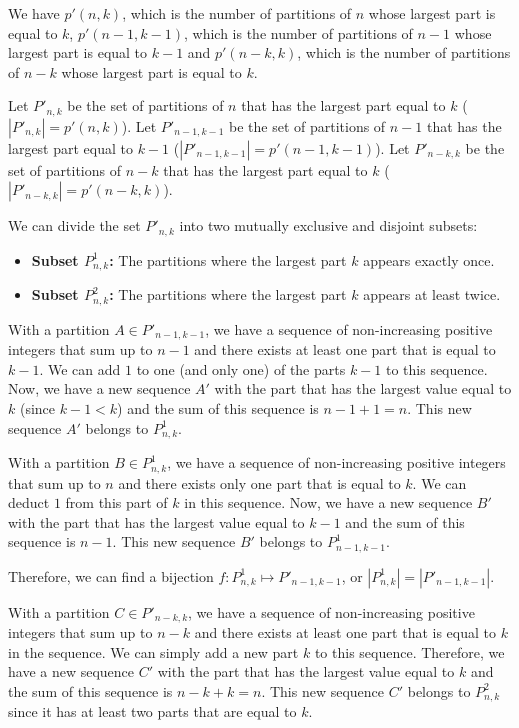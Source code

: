 \documentclass[10pt]{article}
\begin{document}
\begin{enumerate}
\begin{enumerate}
We have $p'(n,k)$, which is the number of partitions of $n$ whose largest part is equal to $k$, $p'(n-1,k-1)$, which is the number of partitions of $n-1$ whose largest part is equal to $k-1$ and $p'(n-k,k)$, which is the number of partitions of $n-k$ whose largest part is equal to $k$.

Let $P'_{n,k}$ be the set of partitions of $n$ that has the largest part equal to $k$ ($|P'_{n,k}|=p'(n,k)$). Let $P'_{n-1,k-1}$ be the set of partitions of $n-1$ that has the largest part equal to $k-1$ ($|P'_{n-1,k-1}|=p'(n-1,k-1)$). Let $P'_{n-k,k}$ be the set of partitions of $n-k$ that has the largest part equal to $k$ ($|P'_{n-k,k}|=p'(n-k,k)$).

We can divide the set $P'_{n,k}$ into two mutually exclusive and disjoint subsets:
\begin{itemize}
    \item \textbf{Subset $P^1_{n,k}$:} The partitions where the largest part $k$ appears exactly once.
    
    \item \textbf{Subset $P^2_{n,k}$:} The partitions where the largest part $k$ appears at least twice.
\end{itemize}

With a partition $A \in P'_{n-1,k-1}$, we have a sequence of non-increasing positive integers that sum up to $n-1$ and there exists at least one part that is equal to $k-1$. We can add $1$ to one (and only one) of the parts $k-1$ to this sequence. Now, we have a new sequence $A'$ with the part that has the largest value equal to $k$ (since $k-1 < k$) and the sum of this sequence is $n-1 + 1 = n$. This new sequence $A'$ belongs to $P^1_{n,k}$.

With a partition $B \in P^1_{n,k}$, we have a sequence of non-increasing positive integers that sum up to $n$ and there exists only one part that is equal to $k$. We can deduct $1$ from this part of $k$ in this sequence. Now, we have a new sequence $B'$ with the part that has the largest value equal to $k-1$ and the sum of this sequence is $n-1$. This new sequence $B'$ belongs to $P^1_{n-1,k-1}$.

Therefore, we can find a bijection $f:P^1_{n,k} \mapsto P'_{n-1,k-1}$, or $|P^1_{n,k}|=|P'_{n-1,k-1}|$.

With a partition $C \in P'_{n-k,k}$, we have a sequence of non-increasing positive integers that sum up to $n-k$ and there exists at least one part that is equal to $k$ in the sequence. We can simply add a new part $k$ to this sequence. Therefore, we have a new sequence $C'$ with the part that has the largest value equal to $k$ and the sum of this sequence is $n-k + k = n$. This new sequence $C'$ belongs to $P^2_{n,k}$ since it has at least two parts that are equal to $k$.


\end{enumerate}
\end{enumerate}
\end{document}

